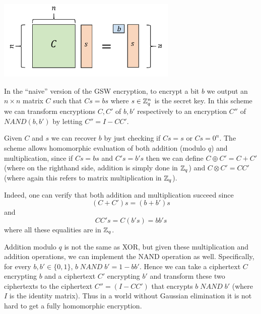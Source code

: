 \begin{marginfigure}
\centering
\includegraphics[width=\linewidth, height=1.5in, keepaspectratio]{../figure/naivegsw.png}
\caption{In the ``naive'' version of the GSW encryption, to encrypt a
bit \(b\) we output an \(n\times n\) matrix \(C\) such that \(Cs=bs\)
where \(s \in {\mathbb{Z}}_q^n\) is the secret key. In this scheme we can
transform encryptions \(C,C'\) of \(b,b'\) respectively to an encryption
\(C''\) of \(\ensuremath{\mathit{NAND}}(b,b')\) by letting
\(C'' = I-CC'\).}
\label{naivegswfig}
\end{marginfigure}

Given \(C\) and \(s\) we can recover \(b\) by just checking if \(Cs=s\)
or \(Cs=0^n\). The scheme allows homomorphic evaluation of both addition
(modulo \(q\)) and multiplication, since if \(Cs = bs\) and \(C's=b's\)
then we can define \(C \oplus C' = C + C'\) (where on the righthand
side, addition is simply done in \({\mathbb{Z}}_q\)) and
\(C\otimes C' = \ensuremath{\mathit{CC}}'\) (where again this refers to
matrix multiplication in \({\mathbb{Z}}_q\)).

Indeed, one can verify that both addition and multiplication succeed
since
\begin{equation*}
(C+C')s = (b+b')s
\end{equation*}
and
\begin{equation*}
\ensuremath{\mathit{CC}}'s = C(b's) = bb's
\end{equation*}
where all these equalities are in \({\mathbb{Z}}_q\).

Addition modulo \(q\) is not the same as XOR, but given these
multiplication and addition operations, we can implement the NAND
operation as well. Specifically, for every \(b,b' \in \{0,1\}\),
\(b \; \ensuremath{\mathit{NAND}} \; b' = 1-bb'\). Hence we can take a
ciphertext \(C\) encrypting \(b\) and a ciphertext \(C'\) encrypting
\(b'\) and transform these two ciphertexts to the ciphertext
\(C''=(I-CC')\) that encrypts \(b\; \ensuremath{\mathit{NAND}} \; b'\)
(where \(I\) is the identity matrix). Thus in a world without Gaussian
elimination it is not hard to get a fully homomorphic encryption.

